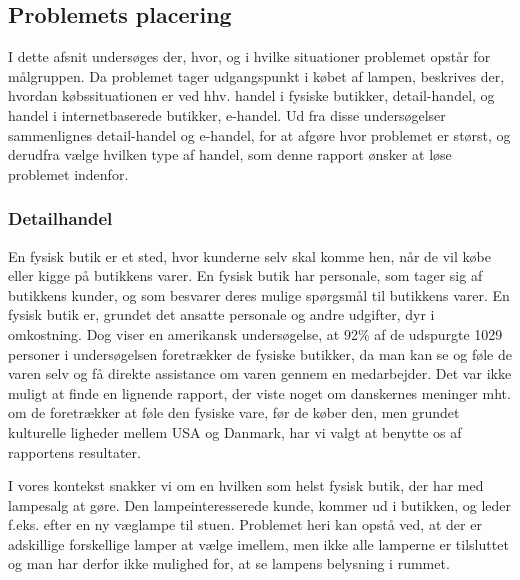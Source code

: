 \subsection{Problemets placering}
I dette afsnit undersøges der, hvor, og i hvilke situationer problemet opstår for målgruppen. Da problemet tager udgangspunkt i købet af lampen, beskrives der, hvordan købssituationen er ved hhv. handel i fysiske butikker, detail-handel, og handel i internetbaserede butikker, e-handel. Ud fra disse undersøgelser sammenlignes detail-handel og e-handel, for at afgøre hvor problemet er størst, og derudfra vælge hvilken type af handel, som denne rapport ønsker at løse problemet indenfor.

\subsubsection{Detailhandel}
En fysisk butik er et sted, hvor kunderne selv skal komme hen, når de vil købe eller kigge på butikkens varer. En fysisk butik har personale, som tager sig af butikkens kunder, og som besvarer deres mulige spørgsmål til butikkens varer. En fysisk butik er, grundet det ansatte personale og andre udgifter, dyr i omkostning. Dog viser en amerikansk undersøgelse, at 92\% af de udspurgte 1029 personer i undersøgelsen foretrækker de fysiske butikker, da man kan se og føle de varen selv og få direkte assistance om varen gennem en medarbejder\cite{fysisk_kontra_online}. Det var ikke muligt at finde en lignende rapport, der viste noget om danskernes meninger mht. om de foretrækker at føle den fysiske vare, før de køber den, men grundet kulturelle ligheder mellem USA og Danmark, har vi valgt at benytte os af rapportens resultater.

I vores kontekst snakker vi om en hvilken som helst fysisk butik, der har med lampesalg at gøre. Den lampeinteresserede kunde, kommer ud i butikken, og leder f.eks. efter en ny væglampe til stuen. Problemet heri kan opstå ved, at der er adskillige forskellige lamper at vælge imellem, men ikke alle lamperne er tilsluttet og man har derfor ikke mulighed for, at se lampens belysning i rummet.

